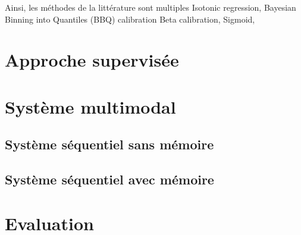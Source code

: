 Ainsi, les méthodes de la littérature sont multiples
Isotonic regression, \cite{Zadrozny2002}
Bayesian Binning into Quantiles (BBQ) calibration\cite{Naeini2015}
Beta calibration,\cite{Kull2017}
Sigmoid,\cite{kull2017b}
\section{Approche supervisée}

\section{Système multimodal}
\subsection{Système séquentiel sans mémoire}
\subsection{Système séquentiel avec mémoire}
\section{Evaluation}
